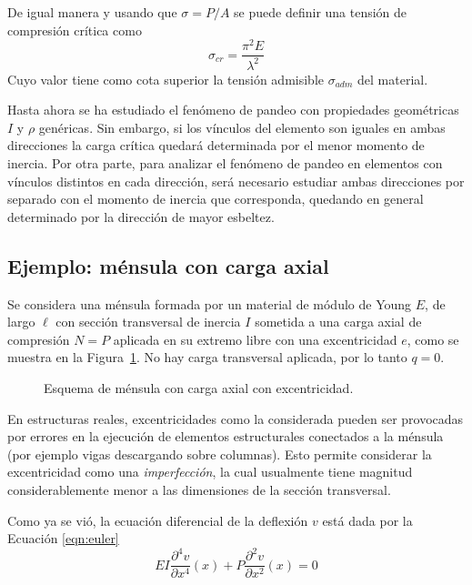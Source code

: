 De igual manera y usando que $\sigma=P/A$ se puede definir una tensión de compresión crítica como  
\begin{equation}
\boxed{\sigma_{cr} = \frac{\pi^2 E}{\lambda^2}}
\end{equation}
Cuyo valor tiene como cota superior la tensión admisible $\sigma_{adm}$ del material.

Hasta ahora se ha estudiado el fenómeno de pandeo con propiedades geométricas $I$ y $\rho$ genéricas. Sin embargo, si los vínculos del elemento son iguales en ambas direcciones la carga crítica quedará determinada por el menor momento de inercia. Por otra parte, para analizar el fenómeno de pandeo en elementos con vínculos distintos en cada dirección, será necesario estudiar ambas direcciones por separado con el momento de inercia que corresponda, quedando en general determinado por la dirección de mayor esbeltez.

\subsection{Ejemplo: ménsula con carga axial}

Se considera una ménsula formada por un material de módulo de Young $E$, de largo $\ell$ con sección transversal de inercia $I$ sometida a una carga axial de compresión $N=P$ aplicada en su extremo libre con una excentricidad $e$, como se muestra en la Figura~\ref{fig:esqpand}. %
%
No hay carga transversal aplicada, por lo tanto $q=0$. %

\begin{figure}[htb]
\centering
\def\svgwidth{0.5\textwidth}

\caption{Esquema de ménsula con carga axial con excentricidad.}
\label{fig:esqpand}
\end{figure}

En estructuras reales, excentricidades como la considerada pueden ser provocadas por errores en la ejecución de elementos estructurales conectados a la ménsula (por ejemplo vigas descargando sobre columnas). %
%
Esto permite considerar la excentricidad como una \textit{imperfección}, la cual usualmente tiene magnitud considerablemente menor a las dimensiones de la sección transversal. %

Como ya se vió, la ecuación diferencial de la deflexión $v$ está dada por la Ecuación \eqref{eqn:euler}
$$
  E I \frac{\partial^4 v}{\partial x^4}(x)
+   P \frac{\partial^2 v}{\partial x^2}(x)
=   0
$$

